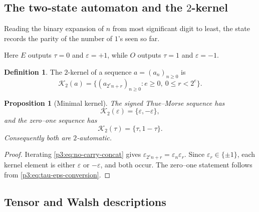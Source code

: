\documentclass[11pt,oneside]{article}
\newtheorem{proposition}[theorem]{Proposition}
\theoremstyle{definition}
\newtheorem{definition}[theorem]{Definition}
\theoremstyle{remark}
\newcommand{\eps}{\varepsilon}
\begin{document}
\subsection{The two-state automaton and the \texorpdfstring{$2$}{2}-kernel}

Reading the binary expansion of $n$ from most significant digit to least, the
state records the parity of the number of $1$'s seen so far.

\begin{center}
\end{center}
Here $E$ outputs $\tau=0$ and $\eps=+1$, while $O$ outputs $\tau=1$ and
$\eps=-1$.

\begin{definition}
The $2$-kernel of a sequence $a=(a_n)_{n\ge0}$ is
\[
 \mathcal K_2(a)=\bigl\{(a_{2^en+r})_{n\ge0}:e\ge0,\ 0\le r<2^e\bigr\}.
\]
\end{definition}

\begin{proposition}[Minimal kernel]\label{p3:prop:kernel}
The signed Thue--Morse sequence has
\[
  \mathcal K_2(\eps)=\{\eps,-\eps\},
\]
and the zero--one sequence has
\[
  \mathcal K_2(\tau)=\{\tau,1-\tau\}.
\]
Consequently both are $2$-automatic.
\end{proposition}

\begin{proof}
Iterating \cref{p3:eq:no-carry-concat} gives
$\eps_{2^en+r}=\eps_n\eps_r$.  Since $\eps_r\in\{\pm1\}$, each kernel element
is either $\eps$ or $-\eps$, and both occur.  The zero--one statement follows
from \cref{p3:eq:tau-eps-conversion}.
\end{proof}

\subsection{Tensor and Walsh descriptions}
\end{document}
